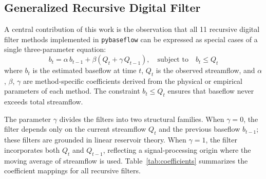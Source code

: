 \documentclass[hydrology,article,submit,pdftex,moreauthors]{Definitions/mdpi}
\begin{document}
\subsection{Generalized Recursive Digital Filter}
\label{sec:generalized_filter}

A central contribution of this work is the observation that all 11 recursive digital filter methods implemented in \texttt{pybaseflow} can be expressed as special cases of a single three-parameter equation:
\begin{equation}
\label{eq:generalized}
b_t = \alpha \, b_{t-1} + \beta \left( Q_t + \gamma \, Q_{t-1} \right), \quad \text{subject to} \quad b_t \leq Q_t
\end{equation}
where $b_t$ is the estimated baseflow at time $t$, $Q_t$ is the observed streamflow, and $\alpha$, $\beta$, $\gamma$ are method-specific coefficients derived from the physical or empirical parameters of each method. The constraint $b_t \leq Q_t$ ensures that baseflow never exceeds total streamflow.

The parameter $\gamma$ divides the filters into two structural families. When $\gamma = 0$, the filter depends only on the current streamflow $Q_t$ and the previous baseflow $b_{t-1}$; these filters are grounded in linear reservoir theory. When $\gamma = 1$, the filter incorporates both $Q_t$ and $Q_{t-1}$, reflecting a signal-processing origin where the moving average of streamflow is used. Table~\ref{tab:coefficients} summarizes the coefficient mappings for all recursive filters.
\end{document}
